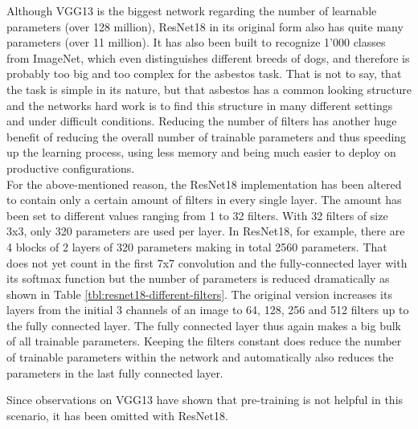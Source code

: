 Although VGG13 is the biggest network regarding the number of learnable parameters (over 128 million), ResNet18 in its original form also has quite many parameters (over 11 million). It has also been built to recognize 1'000 classes from ImageNet, which even distinguishes different breeds of dogs, and therefore is probably too big and too complex for the asbestos task. That is not to say, that the task is simple in its nature, but that asbestos has a common looking structure and the networks hard work is to find this structure in many different settings and under difficult conditions. Reducing the number of filters has another huge benefit of reducing the overall number of trainable parameters and thus speeding up the learning process, using less memory and being much easier to deploy on productive configurations.\\

For the above-mentioned reason, the ResNet18 implementation has been altered to contain only a certain amount of filters in every single layer. The amount has been set to different values ranging from 1 to 32 filters. With 32 filters of size 3x3, only 320 parameters are used per layer. In ResNet18, for example, there are 4 blocks of 2 layers of 320 parameters making in total 2560 parameters. That does not yet count in the first 7x7 convolution and the fully-connected layer with its softmax function but the number of parameters is reduced dramatically as shown in Table \ref{tbl:resnet18-different-filters}. The original version increases its layers from the initial 3 channels of an image to 64, 128, 256 and 512 filters up to the fully connected layer. The fully connected layer thus again makes a big bulk of all trainable parameters. Keeping the filters constant does reduce the number of trainable parameters within the network and automatically also reduces the parameters in the last fully connected layer.

Since observations on VGG13 have shown that pre-training is not helpful in this scenario, it has been omitted with ResNet18.


